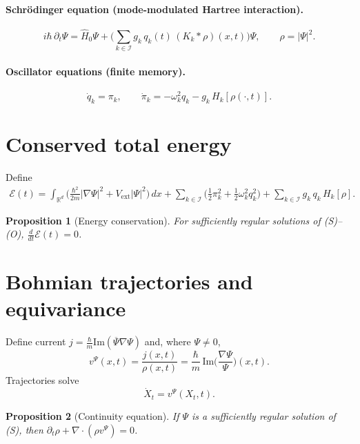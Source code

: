 \documentclass[11pt]{article}
\newtheorem{proposition}{Proposition}
\begin{document}
\paragraph{Schr\"odinger equation (mode-modulated Hartree interaction).}
\begin{equation}
i\hbar\,\partial_t\Psi
=\hat H_0\Psi
+\Big(\sum_{k\in\mathcal{I}} g_k\,q_k(t)\,(K_k*\rho)(x,t)\Big)\Psi,
\qquad \rho=|\Psi|^2.
\tag{S}
\end{equation}

\paragraph{Oscillator equations (finite memory).}
\begin{equation}
\dot q_k=\pi_k,\qquad
\dot \pi_k=-\omega_k^2 q_k - g_k\,H_k[\rho(\cdot,t)].
\tag{O}
\end{equation}

\section{Conserved total energy}
Define
\begin{align*}
\mathcal{E}(t)=
\int_{\mathbb{R}^d}\Big(\frac{\hbar^2}{2m}|\nabla\Psi|^2 + V_{\mathrm{ext}}|\Psi|^2\Big)\,dx
+\sum_{k\in\mathcal{I}}\Big(\frac12\pi_k^2+\frac12\omega_k^2 q_k^2\Big)
+\sum_{k\in\mathcal{I}} g_k\,q_k\,H_k[\rho].
\end{align*}

\begin{proposition}[Energy conservation]
For sufficiently regular solutions of \textup{(S)}--\textup{(O)}, $\frac{d}{dt}\mathcal{E}(t)=0$.
\end{proposition}

\section{Bohmian trajectories and equivariance}
Define current $j=\frac{\hbar}{m}\mathrm{Im}(\overline{\Psi}\nabla\Psi)$ and, where $\Psi\neq0$,
\[
v^\Psi(x,t)=\frac{j(x,t)}{\rho(x,t)}
=\frac{\hbar}{m}\,\mathrm{Im}\Big(\frac{\nabla\Psi}{\Psi}\Big)(x,t).
\]
Trajectories solve
\begin{equation}
\dot X_t=v^\Psi(X_t,t).
\tag{B}
\end{equation}

\begin{proposition}[Continuity equation]
If $\Psi$ is a sufficiently regular solution of \textup{(S)}, then
$\partial_t\rho+\nabla\cdot(\rho v^\Psi)=0$.
\end{proposition}
\end{document}

